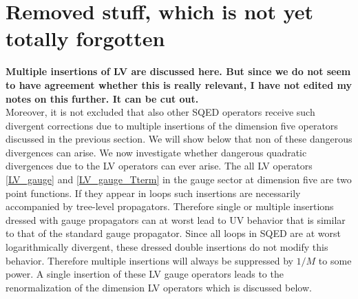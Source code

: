 \documentclass[12pt]{revtex4}
\begin{document}




\section{Removed stuff, which is not yet totally forgotten}

{\bf Multiple insertions of LV are discussed here. But since we do not
seem to have agreement whether this is really relevant, I have not
edited my notes on this further. It can be cut out.} 
\\



Moreover, it is not excluded that also other SQED
operators receive such divergent corrections due to multiple
insertions of the dimension five operators discussed in the previous
section.  We will show below that non of these dangerous
divergences can arise. 
We now investigate whether dangerous quadratic divergences due to the
LV operators can ever arise. The all LV operators \eqref{LV_gauge} and
\eqref{LV_gauge_Tterm} in the gauge sector at dimension five are two
point functions. If they appear in loops such insertions are
necessarily accompanied by tree-level propagators. Therefore single or
multiple insertions dressed with gauge propagators can at worst 
lead to UV behavior that is similar to that of the standard gauge
propagator. Since all loops in SQED are at worst logarithmically
divergent, these dressed double insertions do not modify this behavior. 
Therefore multiple insertions will always be suppressed by $1/M$ to
some power. A single insertion of these LV gauge operators leads to
the renormalization of the dimension LV operators which is discussed
below.  
\end{document}
